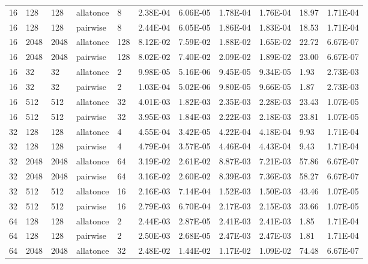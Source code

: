 \documentclass[11pt]{article}
\begin{document}
\begin{table}
\begin{adjustbox}{max width=\textwidth, max totalheight=0.95\textheight}
\begin{tabular}{lllllllllll}
      16  & 128  & 128  & allatonce & 8    & 2.38E-04 & 6.06E-05 & 1.78E-04     & 1.76E-04 & 18.97  & 1.71E-04 \\
      16  & 128  & 128  & pairwise  & 8    & 2.44E-04 & 6.05E-05 & 1.86E-04     & 1.83E-04 & 18.53  & 1.71E-04 \\
      16  & 2048 & 2048 & allatonce & 128  & 8.12E-02 & 7.59E-02 & 1.88E-02     & 1.65E-02 & 22.72  & 6.67E-07 \\
      16  & 2048 & 2048 & pairwise  & 128  & 8.02E-02 & 7.40E-02 & 2.09E-02     & 1.89E-02 & 23.00  & 6.67E-07 \\
      16  & 32   & 32   & allatonce & 2    & 9.98E-05 & 5.16E-06 & 9.45E-05     & 9.34E-05 & 1.93   & 2.73E-03 \\
      16  & 32   & 32   & pairwise  & 2    & 1.03E-04 & 5.02E-06 & 9.80E-05     & 9.66E-05 & 1.87   & 2.73E-03 \\
      16  & 512  & 512  & allatonce & 32   & 4.01E-03 & 1.82E-03 & 2.35E-03     & 2.28E-03 & 23.43  & 1.07E-05 \\
      16  & 512  & 512  & pairwise  & 32   & 3.95E-03 & 1.84E-03 & 2.22E-03     & 2.18E-03 & 23.81  & 1.07E-05 \\
      32  & 128  & 128  & allatonce & 4    & 4.55E-04 & 3.42E-05 & 4.22E-04     & 4.18E-04 & 9.93   & 1.71E-04 \\
      32  & 128  & 128  & pairwise  & 4    & 4.79E-04 & 3.57E-05 & 4.46E-04     & 4.43E-04 & 9.43   & 1.71E-04 \\
      32  & 2048 & 2048 & allatonce & 64   & 3.19E-02 & 2.61E-02 & 8.87E-03     & 7.21E-03 & 57.86  & 6.67E-07 \\
      32  & 2048 & 2048 & pairwise  & 64   & 3.16E-02 & 2.60E-02 & 8.39E-03     & 7.36E-03 & 58.27  & 6.67E-07 \\
      32  & 512  & 512  & allatonce & 16   & 2.16E-03 & 7.14E-04 & 1.52E-03     & 1.50E-03 & 43.46  & 1.07E-05 \\
      32  & 512  & 512  & pairwise  & 16   & 2.79E-03 & 6.70E-04 & 2.17E-03     & 2.15E-03 & 33.66  & 1.07E-05 \\
      64  & 128  & 128  & allatonce & 2    & 2.44E-03 & 2.87E-05 & 2.41E-03     & 2.41E-03 & 1.85   & 1.71E-04 \\
      64  & 128  & 128  & pairwise  & 2    & 2.50E-03 & 2.68E-05 & 2.47E-03     & 2.47E-03 & 1.81   & 1.71E-04 \\
      64  & 2048 & 2048 & allatonce & 32   & 2.48E-02 & 1.44E-02 & 1.17E-02     & 1.09E-02 & 74.48  & 6.67E-07 \\

\end{tabular}
\end{adjustbox}
\end{table}
\end{document}
